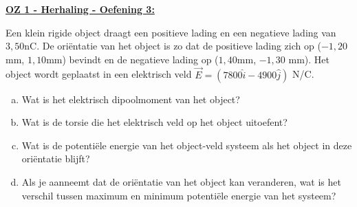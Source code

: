 \textbf{\underline{OZ 1 - Herhaling - Oefening 3:}}
\vspace{0.5cm}

Een klein rigide object draagt een positieve lading en een negatieve lading van $3,50 $nC. De oriëntatie van het object is zo dat de positieve lading zich op ($-1,20 $mm,
$1,10 $mm) bevindt en de negatieve lading op ($1,40 $mm, $-1,30$ mm). Het object wordt geplaatst in
een elektrisch veld $\Vec{E} = (7800\hat{i} - 4900\hat{j})$ N/C.

\begin{enumerate}[(a)]
    \item Wat is het elektrisch dipoolmoment van het object?
    \item Wat is de torsie die het elektrisch veld op het object uitoefent?
    \item Wat is de potentiële energie van het object-veld systeem als het object in deze oriëntatie blijft?
    \item Als je aanneemt dat de oriëntatie van het object kan veranderen, wat is het verschil tussen maximum en minimum potentiële energie van het systeem?
\end{enumerate}


